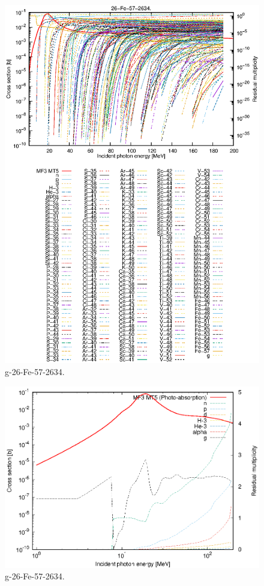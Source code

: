 \begin{figure}
 \includegraphics[width=\linewidth]{eps/g_26-Fe-57_2634.eps}
  \caption{g-26-Fe-57-2634.}
\end{figure}
\newpage \clearpage

\begin{figure}
 \includegraphics[width=\linewidth]{eps-log/g_26-Fe-57_2634.eps}
 \caption{g-26-Fe-57-2634.}
\end{figure}
\newpage \clearpage

